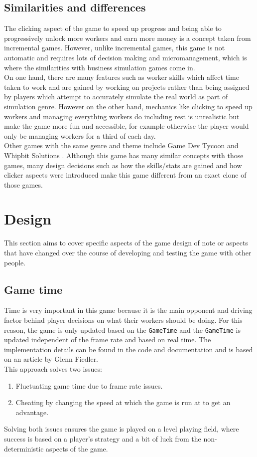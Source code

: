 \documentclass[11pt]{article}
\newcommand{\n}[0]{\\[\baselineskip]}
\begin{document}
\subsection{Similarities and differences}
The clicking aspect of the game to speed up progress and being able to progressively unlock more workers and earn more money is a concept taken from incremental games. However, unlike incremental games, this game is not automatic and requires lots of decision making and micromanagement, which is where the similarities with business simulation games come in. 
\n
On one hand, there are many features such as worker skills which affect time taken to work and are gained by working on projects rather than being assigned by players which attempt to accurately simulate the real world as part of simulation genre. However on the other hand, mechanics like clicking to speed up workers and managing everything workers do including rest is unrealistic but make the game more fun and accessible, for example otherwise the player would only be managing workers for a third of each day. 
\n
Other games with the same genre and theme include Game Dev Tycoon \cite{game-dev-tycoon} and Whipbit Solutions \cite{whipbit}. Although this game has many similar concepts with those games, many design decisions such as how the skills/stats are gained and how clicker aspects were introduced make this game different from an exact clone of those games.

\section{Design}
This section aims to cover specific aspects of the game design of note or aspects that have changed over the course of developing and testing the game with other people.

\subsection{Game time}
Time is very important in this game because it is the main opponent and driving factor behind player decisions on what their workers should be doing. For this reason, the game is only updated based on the \texttt{GameTime} and the \texttt{GameTime} is updated independent of the frame rate and based on real time. The implementation details can be found in the code and documentation and is based on an article \cite{time} by Glenn Fiedler. 
\n
This approach solves two issues:
\begin{enumerate}
\item Fluctuating game time due to frame rate issues.
\item Cheating by changing the speed at which the game is run at to get an advantage. 
\end{enumerate}
Solving both issues ensures the game is played on a level playing field, where success is based on a player's strategy and a bit of luck from the non-deterministic aspects of the game. 
\end{document}
